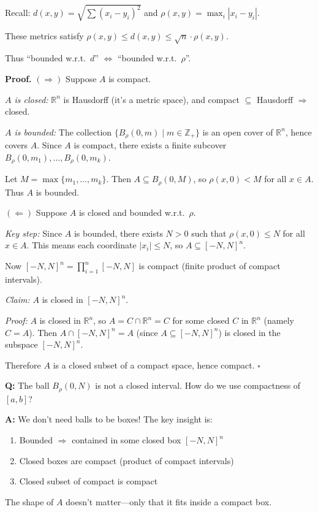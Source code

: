 \documentclass[11pt]{report}
\renewenvironment{proof}[1][Proof]{\noindent\textbf{#1.} }{\hfill$\square$\par\vspace{5pt}}
\begin{document}
\begin{rembox}
Recall: $d(x,y) = \sqrt{\sum (x_i - y_i)^2}$ and $\rho(x,y) = \max_i |x_i - y_i|$.

These metrics satisfy $\rho(x,y) \leq d(x,y) \leq \sqrt{n} \cdot \rho(x,y)$.

Thus ``bounded w.r.t.\ $d$'' $\Leftrightarrow$ ``bounded w.r.t.\ $\rho$''.
\end{rembox}

\begin{proof}
$(\Rightarrow)$ Suppose $A$ is compact. 

\textit{$A$ is closed:} $\mathbb{R}^n$ is Hausdorff (it's a metric space), and compact $\subseteq$ Hausdorff $\Rightarrow$ closed.

\textit{$A$ is bounded:} The collection $\{B_\rho(0, m) \mid m \in \mathbb{Z}_+\}$ is an open cover of $\mathbb{R}^n$, hence covers $A$. Since $A$ is compact, there exists a finite subcover $B_\rho(0, m_1), \ldots, B_\rho(0, m_k)$.

Let $M = \max\{m_1, \ldots, m_k\}$. Then $A \subseteq B_\rho(0, M)$, so $\rho(x, 0) < M$ for all $x \in A$. Thus $A$ is bounded.

$(\Leftarrow)$ Suppose $A$ is closed and bounded w.r.t.\ $\rho$.

\textit{Key step:} Since $A$ is bounded, there exists $N > 0$ such that $\rho(x, 0) \leq N$ for all $x \in A$. This means each coordinate $|x_i| \leq N$, so $A \subseteq [-N, N]^n$.

Now $[-N, N]^n = \prod_{i=1}^{n} [-N, N]$ is compact (finite product of compact intervals).

\textit{Claim:} $A$ is closed in $[-N, N]^n$.

\textit{Proof:} $A$ is closed in $\mathbb{R}^n$, so $A = C \cap \mathbb{R}^n = C$ for some closed $C$ in $\mathbb{R}^n$ (namely $C = A$). Then $A \cap [-N,N]^n = A$ (since $A \subseteq [-N,N]^n$) is closed in the subspace $[-N,N]^n$.

Therefore $A$ is a closed subset of a compact space, hence compact.
\end{proof}

\begin{rembox}
\textbf{Q:} The ball $B_\rho(0, N)$ is not a closed interval. How do we use compactness of $[a,b]$?

\textbf{A:} We don't need balls to be boxes! The key insight is:
\begin{enumerate}
    \item Bounded $\Rightarrow$ contained in some closed box $[-N, N]^n$
    \item Closed boxes are compact (product of compact intervals)
    \item Closed subset of compact is compact
\end{enumerate}
The shape of $A$ doesn't matter---only that it fits inside a compact box.
\end{rembox}
\end{document}
